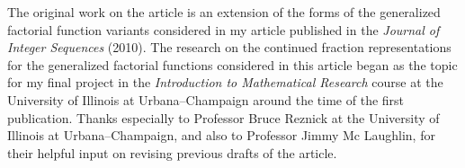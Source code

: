 \documentclass[12pt,reqno]{article}
\numberwithin{sfootnote}{section}
\numberwithin{equation}{section}
\theoremstyle{DefaultTheoremStyle}
\theoremstyle{definition}
\begin{document}
The original work on the article is an extension of the 
forms of the generalized factorial function variants considered in my article 
published in the \emph{Journal of Integer Sequences} (2010). 
The research on the continued fraction representations for the 
generalized factorial functions considered in this article 
began as the topic for my final project in the 
\emph{Introduction to Mathematical Research} course at the 
University of Illinois at Urbana--Champaign 
around the time of the first publication. 
Thanks especially to Professor Bruce Reznick at the 
University of Illinois at Urbana--Champaign, and 
also to Professor Jimmy Mc Laughlin, 
for their helpful input on revising previous drafts of the article. 

\renewcommand{\refname}{References} 
\setlength{\bibsep}{0.05in} 

%  
% 
\end{document}
